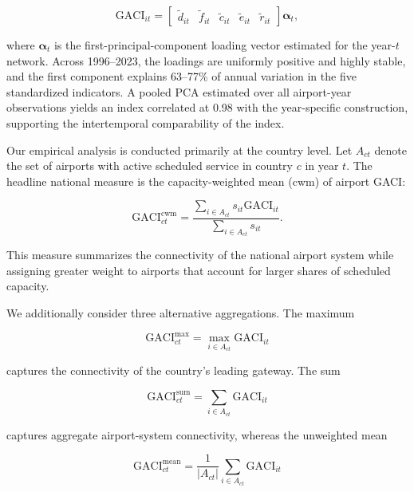 \documentclass[12pt]{article}
\begin{document}
\begin{equation}
\mathrm{GACI}_{it}
=
\begin{bmatrix}
\tilde d_{it} &
\tilde f_{it} &
\tilde c_{it} &
\tilde e_{it} &
\tilde r_{it}
\end{bmatrix}
\boldsymbol{\alpha}_t ,
\label{eq:nature_17}
\end{equation}

where $\boldsymbol{\alpha}_t$ is the first-principal-component loading vector estimated for the year-$t$ network. Across 1996--2023, the loadings are uniformly positive and highly stable, and the first component explains 63--77\% of annual variation in the five standardized indicators. A pooled PCA estimated over all airport-year observations yields an index correlated at 0.98 with the year-specific construction, supporting the intertemporal comparability of the index.

Our empirical analysis is conducted primarily at the country level. Let $A_{ct}$ denote the set of airports with active scheduled service in country $c$ in year $t$. The headline national measure is the capacity-weighted mean (cwm) of airport GACI:

\begin{equation}
\mathrm{GACI}^{\mathrm{cwm}}_{ct}
=
\frac{
\displaystyle
\sum_{i\in A_{ct}}
s_{it}\mathrm{GACI}_{it}
}{
\displaystyle
\sum_{i\in A_{ct}}
s_{it}
}.
\label{eq:nature_18}
\end{equation}

This measure summarizes the connectivity of the national airport system while assigning greater weight to airports that account for larger shares of scheduled capacity.

We additionally consider three alternative aggregations. The maximum

\begin{equation}
\mathrm{GACI}^{\max}_{ct}
=
\max_{i\in A_{ct}}
\mathrm{GACI}_{it}
\label{eq:nature_19}
\end{equation}

captures the connectivity of the country's leading gateway. The sum

\begin{equation}
\mathrm{GACI}^{\mathrm{sum}}_{ct}
=
\sum_{i\in A_{ct}}
\mathrm{GACI}_{it}
\label{eq:nature_20}
\end{equation}

captures aggregate airport-system connectivity, whereas the unweighted mean

\begin{equation}
\mathrm{GACI}^{\mathrm{mean}}_{ct}
=
\frac{1}{|A_{ct}|}
\sum_{i\in A_{ct}}
\mathrm{GACI}_{it}
\label{eq:nature_21}
\end{equation}
\end{document}
